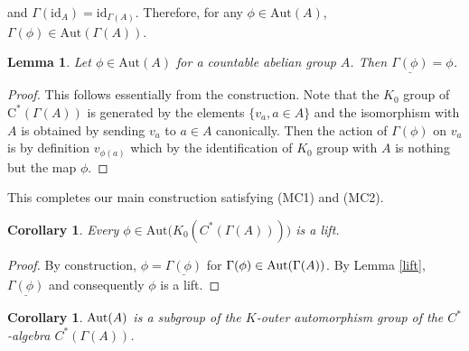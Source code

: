 \documentclass[a4paper,11pt,reqno]{amsart}
\theoremstyle{plain}
\newtheorem{cor}[thm]{Corollary}
\newtheorem{lem}[thm]{Lemma}
\theoremstyle{named}
\numberwithin{equation}{section}
\begin{document}
                            and $\Gamma(\textrm{id}_{A})=\textrm{id}_{\Gamma(A)}$. Therefore, for any $\phi\in\textrm{Aut}(A)$, $\Gamma(\phi)\in\textrm{Aut}(\Gamma(A))$.
                            \begin{lem}
                                Let $\phi\in\textrm{Aut}(A)$ for a countable abelian group $A$. Then $\underline{\Gamma(\phi)}=\phi$.
                            \end{lem}
                            \begin{proof}
                                This follows essentially from the construction. Note that the $K_{0}$ group of $\textrm{C}^{\ast}(\Gamma(A))$ is generated by the elements $\{v_{a}, a\in A\}$ and the isomorphism with $A$ is obtained by sending $v_{a}$ to $a\in A$ canonically. Then the action of $\Gamma(\phi)$ on $v_{a}$ is by definition $v_{\phi(a)}$ which by the identification of $K_{0}$ group with $A$ is nothing but the map $\phi$.
                            \end{proof}
                            This completes our main construction satisfying (MC1) and (MC2).
                        \begin{cor}
                            Every $\phi\in{\textrm {Aut}}\Big(K_{0}(C^{\ast}(\Gamma(A)))\Big)$ is a lift. 
                        \end{cor}
                        \begin{proof}
                            By construction, $\phi=\underline{\Gamma(\phi)}$ for $\Gamma(\phi)\in{\rm Aut}(\Gamma(A))$. By Lemma \ref{lift}, $\underline{\Gamma(\phi)}$ and consequently $\phi$ is a lift. 
                        \end{proof}
                        \begin{cor}
                            ${\rm Aut}(A)$ is a subgroup of the $K$-outer automorphism group of the $C^{\ast}$-algebra $C^{\ast}(\Gamma(A))$.
                        \end{cor}
\end{document}
